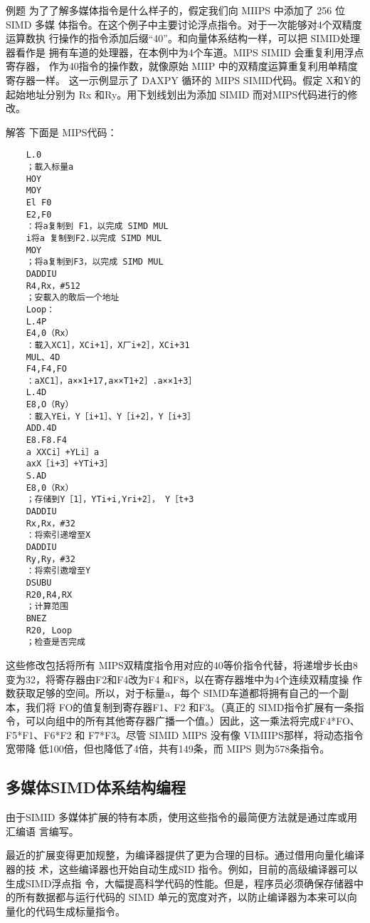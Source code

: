 例题
为了了解多媒体指令是什么样子的，假定我们向 MIIPS 中添加了 256 位 SIMD 多媒
体指令。在这个例子中主要讨论浮点指令。对于一次能够对4个双精度运算数执
行操作的指令添加后缀“40”。和向量体系结构一样，可以把 SIMID处理器看作是
拥有车道的处理器，在本例中为4个车道。MIPS SIMID 会重复利用浮点寄存器，
作为40指令的操作数，就像原始 MIIP 中的双精度运算重复利用单精度寄存器一样。
这一示例显示了 DAXPY 循环的 MIPS SIMID代码。假定 X和Y的起始地址分别为 Rx
和Ry。用下划线划出为添加 SIMID 而对MIPS代码进行的修改。

解答
下面是 MIPS代码：
\begin{verbatim}
    L.0
    ；載入标量a
    HOY
    MOY
    El F0
    E2,F0
    ：将a复制到 F1，以完成 SIMD MUL
    i将a 复制到F2.以完成 SIMD MUL
    MOY
    ；将a复制到F3，以完成 SIMD MUL
    DADDIU
    R4,Rx，#512
    ；安載入的敢后一个地址
    Loop：
    L.4P
    E4,0（Rx）
    ：載入XC1］，XCi+1］，X厂i+2］，XCi+31
    MUL、4D
    F4,F4,FO
    ：aXC1］，a××1+17,a××T1+2］.a××1+3］
    L.4D
    E8,O（Ry）
    ：載入YEi，Y［i+1］、Y［i+2］，Y［i+3］
    ADD.4D
    E8.F8.F4
    a XXCi］+YLi］a
    axX［i+3］+YTi+3］
    S.AD
    E8,0（Rx）
    ；存储到Y［1］，YTi+i,Yri+2］， Y［t+3
    DADDIU
    Rx,Rx，#32
    ：将索引递增至X
    DADDIU
    Ry,Ry，#32
    ：将索引邀增至Y
    DSUBU
    R20,R4,RX
    ；计算范围
    BNEZ
    R20, Loop
    ；检查是否完成
\end{verbatim}
这些修改包括将所有 MIPS双精度指令用对应的40等价指令代替，将递增步长由8
变为32，将寄存器由F2和F4改为F4 和F8，以在寄存器堆中为4个连续双精度操
作数获取足够的空间。所以，对于标量a，每个 SIMD车道都将拥有自己的一个副
本，我们将 FO的值复制到寄存器F1、F2 和F3。（真正的 SIMD指令扩展有一条指
令，可以向组中的所有其他寄存器广播一个值。）因此，这一乘法将完成F4*FO、
F5*F1、F6*F2 和 F7*F3。尽管 SIMID MIPS 没有像 VIMIIPS那样，将动态指令宽带降
低100倍，但也降低了4倍，共有149条，而 MIPS 则为578条指令。

\subsection{多媒体SIMD体系结构编程}
由于SIMID 多媒体扩展的特有本质，使用这些指令的最简便方法就是通过库或用汇编语
言编写。

最近的扩展变得更加规整，为编译器提供了更为合理的目标。通过借用向量化编译器的技
术，这些编译器也开始自动生成SID 指令。例如，目前的高级编译器可以生成SIMD浮点指
令，大幅提高科学代码的性能。但是，程序员必须确保存储器中的所有数据都与运行代码的
SIMD 单元的宽度对齐，以防止编译器为本来可以向量化的代码生成标量指令。
